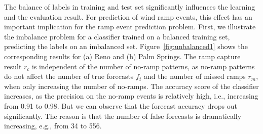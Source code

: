 \documentclass[10pt, conference, compsocconf]{IEEEtran}
\begin{document}
The balance of labels in training and test set significantly influences the learning and the evaluation result. For prediction of wind ramp events, this effect has an important implication for the ramp event prediction problem. First, we illustrate the imbalance problem for a classifier trained on a balanced training set, predicting the labels on an imbalanced set. Figure~\ref{fig:unbalanced1} shows the corresponding results for (a) Reno and (b) Palm Springs. The ramp capture result $r_c$ is independent of the number of no-ramp patterns, as no-ramp patterns do not affect the number of true forecasts $f_t$ and the number of missed ramps $r_m$, when only increasing the number of no-ramps. The accuracy score of the classifier increases, as the precision on the no-ramp events is relatively high, i.e., increasing from 0.91 to 0.98. But we can observe that the forecast accuracy drops out significantly. The reason is that the number of false forecasts is dramatically increasing, e.g., from 34 to 556.
\end{document}
